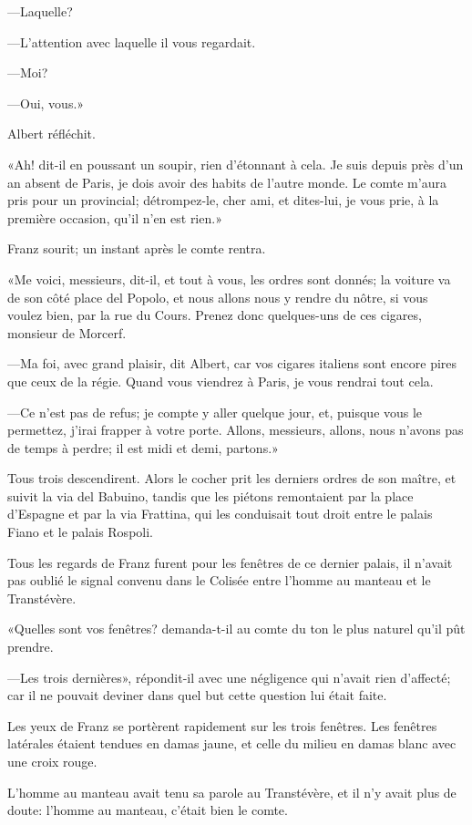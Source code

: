 —Laquelle? 

—L'attention avec laquelle il vous regardait. 

—Moi? 

—Oui, vous.» 

Albert réfléchit. 

«Ah! dit-il en poussant un soupir, rien d'étonnant à cela. Je suis depuis près d'un an absent de Paris, je dois avoir des habits de l'autre monde. Le comte m'aura pris pour un provincial; détrompez-le, cher ami, et dites-lui, je vous prie, à la première occasion, qu'il n'en est rien.» 

Franz sourit; un instant après le comte rentra. 

«Me voici, messieurs, dit-il, et tout à vous, les ordres sont donnés; la voiture va de son côté place del Popolo, et nous allons nous y rendre du nôtre, si vous voulez bien, par la rue du Cours. Prenez donc quelques-uns de ces cigares, monsieur de Morcerf. 

—Ma foi, avec grand plaisir, dit Albert, car vos cigares italiens sont encore pires que ceux de la régie. Quand vous viendrez à Paris, je vous rendrai tout cela. 

—Ce n'est pas de refus; je compte y aller quelque jour, et, puisque vous le permettez, j'irai frapper à votre porte. Allons, messieurs, allons, nous n'avons pas de temps à perdre; il est midi et demi, partons.» 

Tous trois descendirent. Alors le cocher prit les derniers ordres de son maître, et suivit la via del Babuino, tandis que les piétons remontaient par la place d'Espagne et par la via Frattina, qui les conduisait tout droit entre le palais Fiano et le palais Rospoli. 

Tous les regards de Franz furent pour les fenêtres de ce dernier palais, il n'avait pas oublié le signal convenu dans le Colisée entre l'homme au manteau et le Transtévère. 

«Quelles sont vos fenêtres? demanda-t-il au comte du ton le plus naturel qu'il pût prendre. 

—Les trois dernières», répondit-il avec une négligence qui n'avait rien d'affecté; car il ne pouvait deviner dans quel but cette question lui était faite. 

Les yeux de Franz se portèrent rapidement sur les trois fenêtres. Les fenêtres latérales étaient tendues en damas jaune, et celle du milieu en damas blanc avec une croix rouge. 

L'homme au manteau avait tenu sa parole au Transtévère, et il n'y avait plus de doute: l'homme au manteau, c'était bien le comte. 

